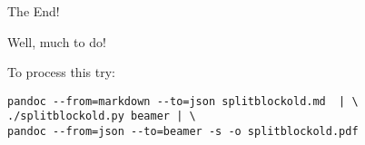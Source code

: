 \documentclass[10pt,english,ignorenonframetext,]{beamer}
\begin{document}
\begin{frame}[fragile]{The End!}

Well, much to do!

To process this try:

\begin{verbatim}
pandoc --from=markdown --to=json splitblockold.md  | \
./splitblockold.py beamer | \
pandoc --from=json --to=beamer -s -o splitblockold.pdf
\end{verbatim}

\end{frame}
\end{document}
